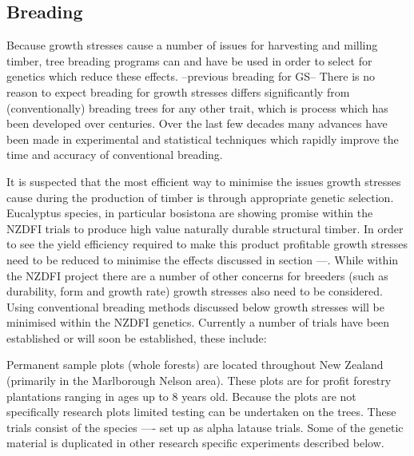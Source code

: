 \documentclass{article}
\begin{document}

\subsection{Breading}
Because growth stresses cause a number of issues for harvesting and milling
timber, tree breading programs can and have be used in order to select for
genetics which reduce these effects. --previous breading for GS-- There is no reason to
expect  breading for growth stresses differs significantly from (conventionally)
breading trees for any other trait, which is process which has been developed
over centuries. Over the last few decades many advances have been made in
experimental and statistical techniques which rapidly improve the time and
accuracy of conventional breading.

It is suspected that the most efficient way to minimise the issues growth
stresses cause during the production of timber is through appropriate genetic
selection. Eucalyptus species, in particular bosistona are showing promise
within the NZDFI trials to produce high value naturally durable structural
timber. In order to see the yield efficiency required to make this
product profitable growth stresses need to be reduced to minimise the
effects discussed in section ---. While within the NZDFI project there are a
number of other concerns for breeders (such as durability, form and growth
rate) growth stresses also need to be considered. Using conventional breading
methods discussed below growth stresses will be minimised within the NZDFI
genetics. Currently a number of trials have been established or will soon be
established, these include:

Permanent sample plots (whole forests) are located throughout New Zealand
(primarily in the Marlborough Nelson area).
These plots are for profit forestry plantations ranging in ages up to 8 years
old.
Because the plots are not specifically research plots limited testing can be
undertaken on the trees. These trials consist of the species ---- set up as
alpha latause trials. Some of the genetic material is duplicated in other
research specific experiments described below.
\end{document}

